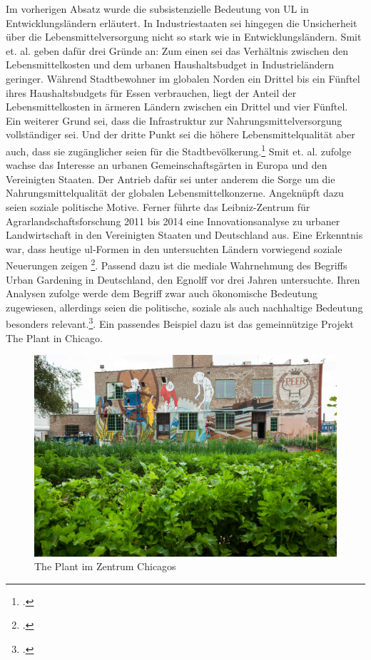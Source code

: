 \documentclass{scrartcl}
\begin{document}
Im vorherigen Absatz wurde die subsistenzielle Bedeutung von UL in Entwicklungsländern erläutert. In Industriestaaten sei hingegen die Unsicherheit über die Lebensmittelversorgung nicht so stark wie in Entwicklungsländern. Smit et. al. geben dafür drei Gründe an: Zum einen sei das Verhältnis zwischen den Lebensmittelkosten und dem urbanen Haushaltsbudget in Industrieländern geringer. Während Stadtbewohner im globalen Norden ein Drittel bis ein Fünftel ihres Haushaltsbudgets für Essen verbrauchen, liegt der Anteil der Lebensmittelkosten in ärmeren Ländern zwischen ein Drittel und vier Fünftel. Ein weiterer Grund sei, dass die Infrastruktur zur Nahrungsmittelversorgung vollständiger sei. Und der dritte Punkt sei die höhere Lebensmittelqualität aber auch, dass sie zugänglicher seien für die Stadtbevölkerung.\footcites[Vgl.][S.27]{Smit2001UrbanToday} Smit et. al. zufolge wachse das Interesse an urbanen Gemeinschaftsgärten in Europa und den Vereinigten Staaten. Der Antrieb dafür sei unter anderem die Sorge um die Nahrungsmittelqualität der globalen Lebensmittelkonzerne. Angeknüpft dazu seien soziale politische Motive. Ferner führte das Leibniz-Zentrum für Agrarlandschaftsforschung 2011 bis 2014 eine Innovationsanalyse zu urbaner Landwirtschaft in den Vereinigten Staaten und Deutschland aus. Eine Erkenntnis war, dass heutige \acs{ul}-Formen in den untersuchten Ländern vorwiegend soziale Neuerungen zeigen \footcite{Berges2014UrbaneStadt}. Passend dazu ist die mediale Wahrnehmung des Begriffs Urban Gardening in Deutschland, den Egnolff vor drei Jahren untersuchte. Ihren Analysen zufolge werde dem Begriff zwar auch ökonomische Bedeutung zugewiesen, allerdings seien die politische, soziale als auch nachhaltige Bedeutung besonders relevant.\footcite[Vgl.][S.119ff]{Egnolff2015DieIdeal}. Ein passendes Beispiel dazu ist das gemeinnützige Projekt The Plant in Chicago.



\begin{figure}[htbp]
    \centering
    \includegraphics[width=14cm]{image_folder/the_plant_1.jpg}
    \caption{The Plant im Zentrum Chicagos}
\end{figure} 
\end{document}
